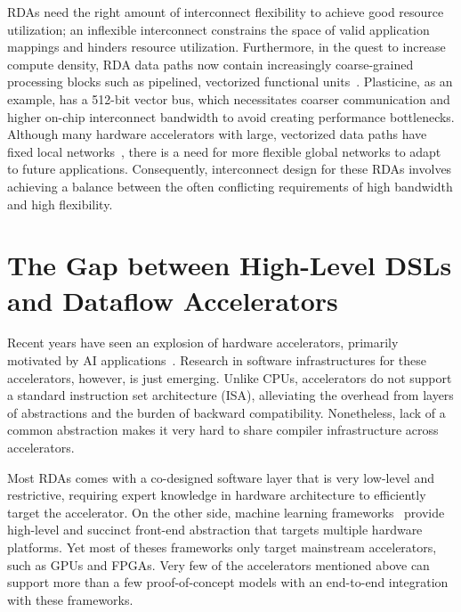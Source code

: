 RDAs need the right amount of interconnect flexibility to achieve good resource utilization; 
an inflexible interconnect constrains the space of
valid application mappings and hinders resource utilization. 
Furthermore, 
in the quest to increase compute density, RDA data paths now 
contain increasingly coarse-grained processing blocks such as pipelined, vectorized functional 
units~\cite{plasticine, piperench, xilinx-acap}.
Plasticine, as an example, has a 512-bit vector bus, which necessitates coarser communication and higher on-chip interconnect bandwidth to avoid creating performance bottlenecks. 
Although many hardware accelerators with large, vectorized data paths have fixed local networks~\cite{brainwave}, there is a need for more
flexible global networks to adapt to future applications.
Consequently, interconnect design for these RDAs involves achieving a balance between the often conflicting requirements of high bandwidth and high flexibility.

\section{The Gap between High-Level DSLs and Dataflow Accelerators}

Recent years have seen an explosion of hardware accelerators, primarily motivated by AI
applications~\cite{tangram,truenorth,memristive,dadiannao,pudiannao,chen2017eyeriss,eie,reno,convengine,minerva,dnpu,cbrain}. 
Research in software infrastructures for these accelerators, however, is just emerging.
Unlike CPUs, accelerators do not support a standard instruction set architecture (ISA), alleviating the overhead from
layers of abstractions and the burden of backward compatibility. 
Nonetheless, lack of a common abstraction makes it very hard to share compiler infrastructure
across accelerators. 

Most RDAs comes with a co-designed software layer that is very low-level and restrictive,
requiring expert knowledge in hardware architecture to efficiently target the accelerator.
On the other side,
machine learning frameworks~\cite{tensorflow,caffe,pytorch,taco,onnc,tc} provide high-level and 
succinct front-end abstraction that targets multiple hardware platforms. 
Yet most of theses frameworks only target mainstream accelerators, such as GPUs and FPGAs.
Very few of the accelerators mentioned above can support more than a few proof-of-concept models
with an end-to-end integration with these frameworks.

